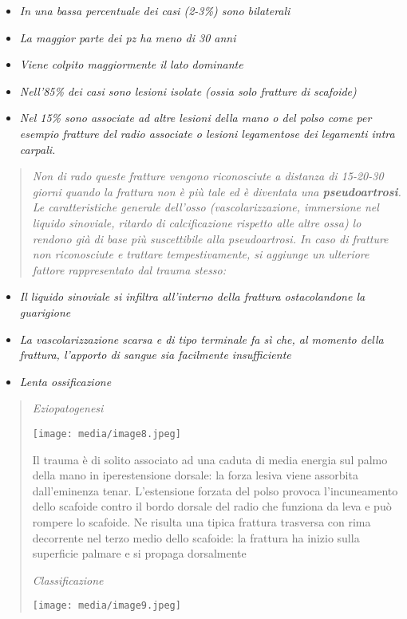 \documentclass[]{article}
\begin{document}
\begin{itemize}
\item
  \emph{In una bassa percentuale dei casi (2-3\%) sono bilaterali}
\item
  \emph{La maggior parte dei pz ha meno di 30 anni}
\item
  \emph{Viene colpito maggiormente il lato dominante}
\item
  \emph{Nell'85\% dei casi sono lesioni isolate (ossia solo fratture di
  scafoide)}
\item
  \emph{Nel 15\% sono associate ad altre lesioni della mano o del polso
  come per esempio fratture del radio associate o lesioni legamentose
  dei legamenti intra carpali.}
\end{itemize}

\begin{quote}
\emph{Non di rado queste fratture vengono riconosciute a distanza di
15-20-30 giorni quando la frattura non è più tale ed è diventata una
\textbf{\emph{pseudoartrosi}}. Le caratteristiche generale dell'osso
(vascolarizzazione, immersione nel liquido sinoviale, ritardo di
calcificazione rispetto alle altre ossa) lo rendono già di base più
suscettibile alla pseudoartrosi. In caso di fratture non riconosciute e
trattare tempestivamente, si aggiunge un ulteriore fattore rappresentato
dal trauma stesso:}
\end{quote}

\begin{itemize}
\item
  \emph{Il liquido sinoviale si infiltra all'interno della frattura
  ostacolandone la guarigione}
\item
  \emph{La vascolarizzazione scarsa e di tipo terminale fa sì che, al
  momento della frattura, l'apporto di sangue sia facilmente
  insufficiente}
\item
  \emph{Lenta ossificazione}
\end{itemize}

\begin{quote}
\emph{Eziopatogenesi}

\texttt{[image: media/image8.jpeg]}

Il trauma è di solito associato ad una caduta di media energia sul palmo
della mano in iperestensione dorsale: la forza lesiva viene assorbita
dall'eminenza tenar. L'estensione forzata del polso provoca
l'incuneamento dello scafoide contro il bordo dorsale del radio che
funziona da leva e può rompere lo scafoide. Ne risulta una tipica
frattura trasversa con rima decorrente nel terzo medio dello scafoide:
la frattura ha inizio sulla superficie palmare e si propaga dorsalmente

\emph{Classificazione}

\texttt{[image: media/image9.jpeg]}
\end{quote}
\end{document}
